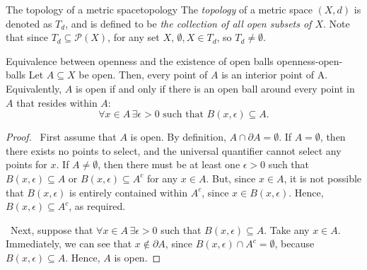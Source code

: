 \documentclass{article}
\newcommand*\iffforward{\par\boxed\Longrightarrow\ }
\newcommand*\iffbackward{\par\boxed\Longleftarrow\ }
\numberwithin{equation}{section}
\numberwithin{figure}{section}
\begin{document}
\begin{definition}{The topology of a metric space}{topology}
    The \emph{topology} of a metric space $ (X, d) $ is denoted as $ T_d $, and
    is defined to be \emph{the collection of all open subsets of $ X $}. Note
    that since $ T_d \subseteq \mathcal{P}(X) $, for any set $ X $, $ \emptyset,
    X \in T_d $, so $ T_d \neq \emptyset $.
\end{definition}
\begin{theorem}{Equivalence between openness and the existence of open balls}
        {openness-open-balls}
    Let $ A \subseteq X $ be open. Then, every point of $ A $ is an interior
    point of A. Equivalently, $ A $ is open if and only if there is an open ball
    around every point in $ A $ that resides within $ A $:
    \begin{equation}
        \forall x \in A\, \exists \epsilon > 0 \text{ such that } B (x,
        \epsilon) \subseteq A.
    \end{equation}

    \begin{minipage}{\dimexpr.6\linewidth-2em-2.5pt}
        \begin{proof}
            \iffforward First assume that $ A $ is open. By definition, $ A \cap
            \partial A = \emptyset $. If $ A = \emptyset $, then there exists no
            points to select, and the universal quantifier cannot select any
            points for $ x $. If $ A \neq \emptyset $, then there must be at
            least one $ \epsilon > 0 $ such that $ B(x, \epsilon) \subseteq A $
            or $ B(x, \epsilon) \subseteq A^c $ for any $ x \in A $. But, since
            $ x \in A $, it is not possible that $ B(x, \epsilon) $ is entirely
            contained within $ A^c $, since $ x \in B(x, \epsilon) $. Hence, $
            B(x, \epsilon) \subseteq A^c $, as required.

            \iffbackward Next, suppose that $ \forall x \in A\, \exists \epsilon
            > 0 $ such that $ B (x, \epsilon) \subseteq A $. Take any $ x \in A
            $.  Immediately, we can see that $ x \not\in \partial A $, since $
            B(x, \epsilon) \cap A^c = \emptyset $, because $ B(x, \epsilon)
            \subseteq A $. Hence, $ A $ is open.
        \end{proof}
    \end{minipage}\hspace*{2em}%
    \begin{minipage}{.4\linewidth}
        \centering
    \end{minipage}
\end{theorem}
\end{document}
